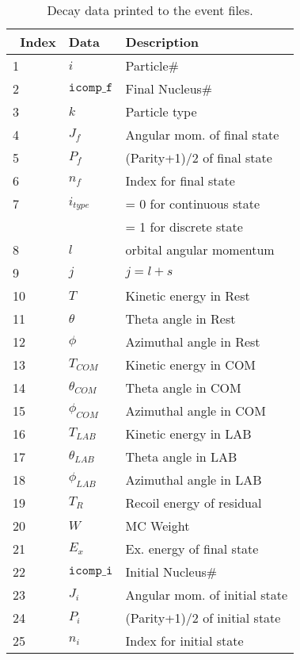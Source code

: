 \documentclass[
10pt,
showpacs,preprintnumbers,footinbib,
amsfonts,amsmath,amssymb,
aps,
prc,twocolumn,groupedaddress,superscriptaddress,
showkeys,
nofootinbib
]{revtex4-1}
\begin{document}
\begin{table}
\caption{Decay data printed to the event files.}
\begin{tabular}{| p{1cm} | p{2cm} | p{4.5cm}|} 
\hline\
Index & Data & Description \\
\hline\hline
 1   &  $i$                                & Particle\# \\
 2   &  ${\texttt{icomp\_f}}$     &  Final Nucleus\# \\
 3   &  $k$                                & Particle type \\   
 4   &  $J_f$                             & Angular mom. of final state \\
 5   &  $P_f$                        & (Parity+1)/2 of final state \\
 6   &  $n_f$                           &  Index for final state\\
 7   &  $i_{type}$                       &  = 0 for continuous state\\
     &                                       & = 1 for discrete state\\
 8   &    $l$                             & orbital angular momentum\\  
 9   &    $j$                             & $j = l+s$\\
10  &    $T$                         & Kinetic energy in Rest\\
11  &    $\theta$                & Theta angle in Rest \\
12  &    $\phi$                & Azimuthal angle in Rest \\
13  &    $T_{COM}$             & Kinetic energy in COM\\
14  &    $\theta_{COM}$        & Theta angle in COM\\
15  &    $\phi_{COM}$             & Azimuthal angle in COM\\
16  &    $T_{LAB}$             & Kinetic energy in LAB\\
17  &    $\theta_{LAB}$        & Theta angle in LAB\\
18  &    $\phi_{LAB}$             & Azimuthal angle in LAB\\
19 &    $T_R$             & Recoil energy of residual\\
20 &    $W$                       & MC Weight \\
21 &    $E_x$                       & Ex. energy of final state\\
22   &  ${\texttt{icomp\_i}}$     &  Initial Nucleus\# \\
23   &  $J_i$                             & Angular mom. of initial state \\
24  &  $P_i$                        & (Parity+1)/2 of initial state \\
25  &  $n_i$                           &  Index for initial state\\
\hline
\end{tabular}
\label{tab:events}
\end{table}
\end{document}
